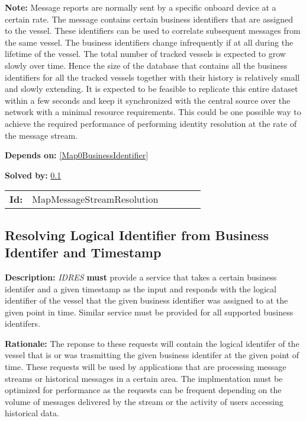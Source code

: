 \textbf{Note:} Message reports are normally sent by a specific onboard device at a certain rate. The message contains certain business identifiers that are assigned to the vessel. These identifiers can be used to correlate subsequent messages from the same vessel. The business identifiers  change infrequently if at all during the lifetime of the vessel. The total number of tracked vessels is expected to grow slowly over time.  Hence the size of the database that contains all the business identifiers for all the tracked vessels together with their history is relatively small and slowly extending. It is expected to be feasible to replicate this entire dataset within a few seconds and keep it synchronized with  the central source over the network with a minimal resource requirements.  This could be one possible way to achieve the required performance  of performing identity resolution at the rate of the message stream.

\textbf{Depends on:} \ref{Map0BusinessIdentifier} 

\textbf{Solved by:} \ref{MapReqBusinessTimestampToPeriod} 

\par
{\small \begin{center}\begin{tabular}{rlrlrl}
\textbf{Id:} & MapMessageStreamResolution  & & & \end{tabular}\end{center} }

\subsection{Resolving Logical Identifier from Business Identifer and Timestamp}\label{MapReqBusinessTimestampToPeriod}
\textbf{Description:} \textsl{IDRES} \textbf{must} provide a service that takes a certain business identifer and a given timestamp as the input  and responds with the logical identifier of the vessel that  the given business identifier was assigned to at the given point in time. Similar service must be provided for all supported business identifers.

\textbf{Rationale:} The reponse to these requests will contain the logical identifer  of the vessel that is or was trasmitting the given business identifer  at the given point of time. These requests will be used by applications that are processing  message streams or historical messages in a certain area.  The implmentation must be optimized for performance as the requests can be frequent depending on the  volume of messages delivered by the stream or the activity of users accessing historical data.

